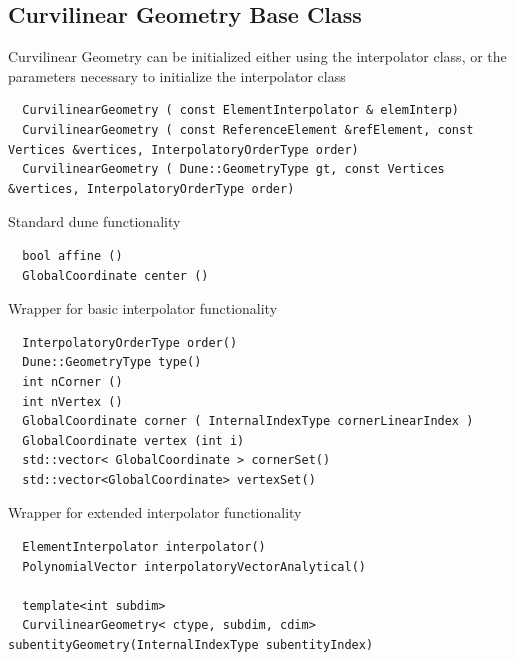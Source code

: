 \subsection{Curvilinear Geometry Base Class}
\label{interface-curvilineargeometry}

\noindent
Curvilinear Geometry can be initialized either using the interpolator class, or the parameters necessary to initialize the interpolator class \\

\begin{mybox}
\begin{lstlisting}
  CurvilinearGeometry ( const ElementInterpolator & elemInterp)
  CurvilinearGeometry ( const ReferenceElement &refElement, const Vertices &vertices, InterpolatoryOrderType order)
  CurvilinearGeometry ( Dune::GeometryType gt, const Vertices &vertices, InterpolatoryOrderType order)
\end{lstlisting}
\end{mybox}

\noindent
Standard dune functionality \\
\begin{mybox}
\begin{lstlisting}
  bool affine ()
  GlobalCoordinate center ()
\end{lstlisting}
\end{mybox}

\noindent
Wrapper for basic interpolator functionality \\
\begin{mybox}
\begin{lstlisting}
  InterpolatoryOrderType order()
  Dune::GeometryType type()
  int nCorner ()
  int nVertex ()
  GlobalCoordinate corner ( InternalIndexType cornerLinearIndex )
  GlobalCoordinate vertex (int i)
  std::vector< GlobalCoordinate > cornerSet()
  std::vector<GlobalCoordinate> vertexSet()
\end{lstlisting}
\end{mybox}

\noindent
Wrapper for extended interpolator functionality \\
\begin{mybox}
\begin{lstlisting}
  ElementInterpolator interpolator()
  PolynomialVector interpolatoryVectorAnalytical()

  template<int subdim>
  CurvilinearGeometry< ctype, subdim, cdim>  subentityGeometry(InternalIndexType subentityIndex)
\end{lstlisting}
\end{mybox}

